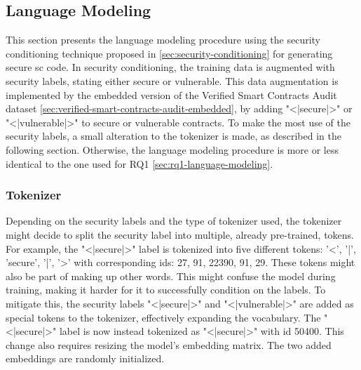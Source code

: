 \subsection{Language Modeling}
\label{sec:rq2-language-modeling}
This section presents the language modeling procedure using the security conditioning technique proposed in \cref{sec:security-conditioning} for generating secure \acrlong{sc} code. In security conditioning, the training data is augmented with security labels, stating either secure or vulnerable. This data augmentation is implemented by the embedded version of the Verified Smart Contracts Audit dataset \cref{sec:verified-smart-contracts-audit-embedded}, by adding "<|secure|>" or "<|vulnerable|>" to secure or vulnerable contracts. To make the most use of the security labels, a small alteration to the tokenizer is made, as described in the following section. Otherwise, the language modeling procedure is more or less identical to the one used for RQ1 \cref{sec:rq1-language-modeling}.

\subsubsection{Tokenizer}
Depending on the security labels and the type of tokenizer used, the tokenizer might decide to split the security label into multiple, already pre-trained, tokens. For example, the "<|secure|>" label is tokenized into five different tokens: '<', '|', 'secure', '|', '>' with corresponding ids: 27, 91, 22390, 91, 29. These tokens might also be part of making up other words. This might confuse the model during training, making it harder for it to successfully condition on the labels. To mitigate this, the security labels "<|secure|>" and "<|vulnerable|>" are added as special tokens to the tokenizer, effectively expanding the vocabulary. The "<|secure|>" label is now instead tokenized as "<|secure|>" with id 50400. This change also requires resizing the model's embedding matrix. The two added embeddings are randomly initialized.

